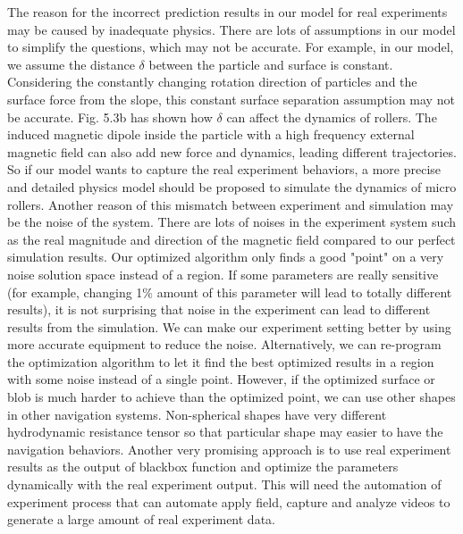  The reason for the incorrect prediction results in our model for real experiments may be caused by inadequate physics. There are lots of assumptions in our model to simplify the questions, which may not be accurate. For example, in our model,  we assume the distance $\delta$ between the particle and surface is constant. Considering the constantly changing rotation direction of particles and the surface force from the slope, this constant surface separation assumption may not be accurate. Fig. 5.3b has shown how $\delta$ can affect the dynamics of rollers. The induced magnetic dipole inside the particle with a high frequency external magnetic field can also add new force and dynamics, leading different trajectories.
 So if our model wants to capture the real experiment behaviors, a more precise and detailed physics model should be proposed to  simulate the dynamics of micro rollers. Another reason of this mismatch between experiment and simulation may be the noise of the system. There are lots of noises in the experiment system  such as the real magnitude and direction of the magnetic field compared to our perfect simulation results. Our optimized algorithm only finds a good  "point" on a very noise solution space instead of a region. If some parameters are really sensitive (for example, changing 1$\%$ amount of this parameter will lead to totally different results), it is not surprising that noise in the experiment can lead to different results from the simulation. We can make our experiment setting better by using more accurate equipment to reduce the noise. Alternatively, we can re-program the optimization algorithm to let it find the best optimized results in a region with some noise instead of a single point. However, if the optimized  surface or blob is much harder to achieve than the optimized point, we can use other shapes in other navigation systems. Non-spherical shapes have very different hydrodynamic resistance tensor\autocite{brooks2018shape} so that particular shape may easier to have the navigation behaviors. Another very promising approach is to use real experiment results as the output of blackbox function and optimize the parameters dynamically with the real experiment output. This will need the automation of experiment process that can automate apply field, capture and analyze  videos to generate a large amount of real experiment data\autocite{oulmas20183d}.

